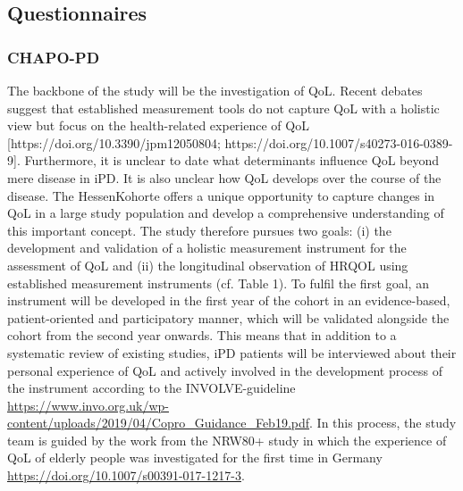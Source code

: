 \subsection{Questionnaires}
\label{subsec:questionnaires}
\subsubsection{\acl{CHAPO-PD}}
\label{questionnaires:chapo}
The backbone of the study will be the investigation of \ac{QoL}. Recent debates suggest that established measurement tools do not capture \ac{QoL} with a holistic view but focus on the health-related experience of \ac{QoL} [https://doi.org/10.3390/jpm12050804; https://doi.org/10.1007/s40273-016-0389-9]. Furthermore, it is unclear to date what determinants influence \ac{QoL} beyond mere disease in \ac{iPD}. It is also unclear how \ac{QoL} develops over the course of the disease. The HessenKohorte offers a unique opportunity to capture changes in \ac{QoL} in a large study population and develop a comprehensive understanding of this important concept. The study therefore pursues two goals: (i) the development and validation of a holistic measurement instrument for the assessment of \ac{QoL} and (ii) the longitudinal observation of \ac{HRQOL} using established measurement instruments (cf. Table 1). 
To fulfil the first goal, an instrument will be developed in the first year of the cohort in an evidence-based, patient-oriented and participatory manner, which will be validated alongside the cohort from the second year onwards.  This means that in addition to a systematic review of existing studies, \ac{iPD} patients will be interviewed about their personal experience of \ac{QoL} and actively involved in the development process of the instrument according to the INVOLVE-guideline \url{https://www.invo.org.uk/wp-content/uploads/2019/04/Copro_Guidance_Feb19.pdf}. In this process, the study team is guided by the work from the NRW80+ study in which the experience of \ac{QoL} of elderly people was investigated for the first time in Germany \url{https://doi.org/10.1007/s00391-017-1217-3}.

